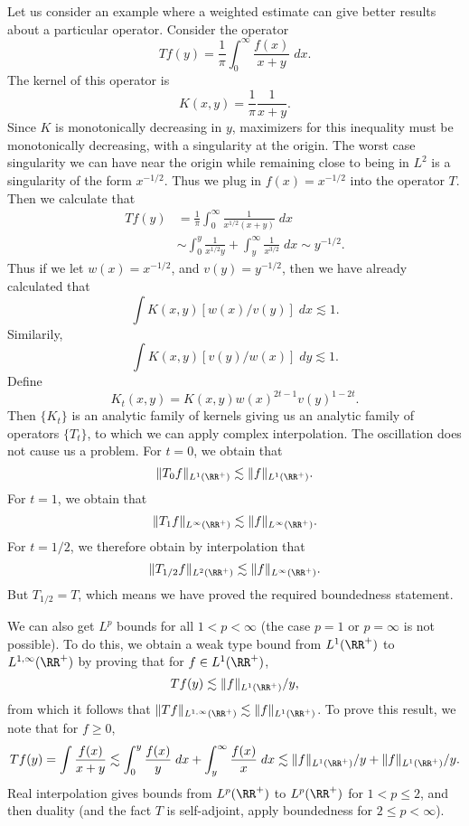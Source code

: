\begin{example}
    Let us consider an example where a weighted estimate can give better results about a particular operator.  Consider the operator
    \[ Tf(y) = \frac{1}{\pi} \int_0^\infty \frac{f(x)}{x + y}\; dx. \]
    The kernel of this operator is
    \[ K(x,y) = \frac{1}{\pi} \frac{1}{x + y}. \]
    Since $K$ is monotonically decreasing in $y$, maximizers for this inequality must be monotonically decreasing, with a singularity at the origin. The worst case singularity we can have near the origin while remaining close to being in $L^2$ is a singularity of the form $x^{-1/2}$. Thus we plug in $f(x) = x^{-1/2}$ into the operator $T$. Then we calculate that
    \begin{align*}
        Tf(y) &= \frac{1}{\pi} \int_0^\infty \frac{1}{x^{1/2} (x + y)}\; dx\\
        &\sim \int_0^y \frac{1}{x^{1/2} y} + \int_y^\infty \frac{1}{x^{3/2}}\; dx \sim y^{-1/2}.
    \end{align*}
    Thus if we let $w(x) = x^{-1/2}$, and $v(y) = y^{-1/2}$, then we have already calculated that
    \[ \int K(x,y) [w(x) / v(y)]\; dx \lesssim 1. \]
    Similarily,
    \[ \int K(x,y) [v(y) / w(x)]\; dy \lesssim 1. \]
    Define
    \[ K_t(x,y) = K(x,y) w(x)^{2t - 1} v(y)^{1-2t}. \]
    Then $\{ K_t \}$ is an analytic family of kernels giving us an analytic family of operators $\{ T_t \}$, to which we can apply complex interpolation. The oscillation does not cause us a problem. For $t = 0$, we obtain that
    \[ \| T_0 f \|_{L^1(\RR^+)} \lesssim \| f \|_{L^1(\RR^+)}. \]
    For $t = 1$, we obtain that
    \[ \| T_1 f \|_{L^\infty(\RR^+)} \lesssim \| f \|_{L^\infty(\RR^+)}. \]
    For $t = 1/2$, we therefore obtain by interpolation that
    \[ \| T_{1/2} f \|_{L^2(\RR^+)} \lesssim \| f \|_{L^\infty(\RR^+)}. \]
    But $T_{1/2} = T$, which means we have proved the required boundedness statement.

    We can also get $L^p$ bounds for all $1 < p < \infty$ (the case $p = 1$ or $p = \infty$ is not possible). To do this, we obtain a weak type bound from $L^1(\RR^+)$ to $L^{1,\infty}(\RR^+)$ by proving that for $f \in L^1(\RR^+)$,
    \[ Tf(y) \lesssim \| f \|_{L^1(\RR^+)} / y, \]
    from which it follows that $\| Tf \|_{L^{1,\infty}(\RR^+)} \lesssim \| f \|_{L^1(\RR^+)}$. To prove this result, we note that for $f \geq 0$,
    \[ Tf(y) = \int \frac{f(x)}{x + y} \lesssim \int_0^y \frac{f(x)}{y}\; dx + \int_y^\infty \frac{f(x)}{x}\; dx \lesssim \| f \|_{L^1(\RR^+)} / y + \| f \|_{L^1(\RR^+)} / y. \]
    Real interpolation gives bounds from $L^p(\RR^+)$ to $L^p(\RR^+)$ for $1 < p \leq 2$, and then duality (and the fact $T$ is self-adjoint, apply boundedness for $2 \leq p < \infty$).
\end{example}

